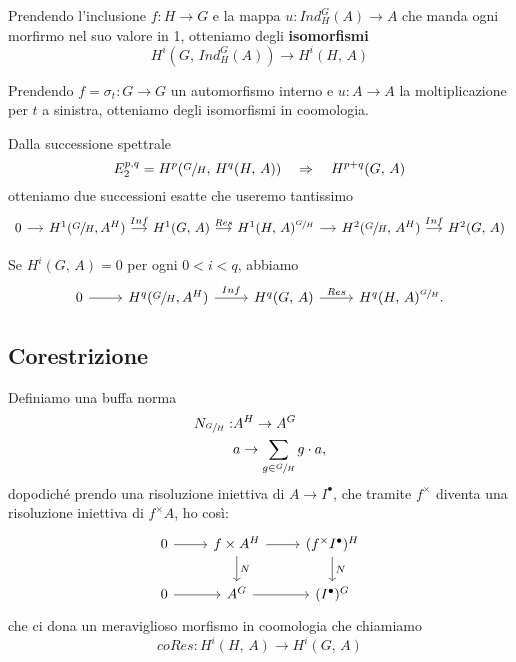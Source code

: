 \documentclass[a4paper]{article}
\begin{document}
	\begin{theorem}
		Prendendo l'inclusione $ f \colon H \to G $ e la mappa $ u \colon Ind_H^G(A) \to A $ che manda ogni morfirmo nel suo valore in 1, otteniamo degli \textbf{isomorfismi} \[ H^i(G, \, Ind_H^G(A)) \to H^i(H, \, A) \]
	\end{theorem}

	\begin{theorem}
		Prendendo $ f = \sigma_t \colon G \to G $ un automorfismo interno e $ u \colon A \to A $ la moltiplicazione per $ t $ a sinistra, otteniamo degli isomorfismi in coomologia.
	\end{theorem}

	\begin{theorem}
		Dalla successione spettrale \[ E^{p, q}_2 = H^p(\sfrac{G}{H}, \, H^q(H, \, A)) \quad\Rightarrow\quad H^{p+q}(G,\, A) \] otteniamo due successioni esatte che useremo tantissimo
		\[ \begin{tikzcd}[column sep = small]
		0 \rar & H^1(\sfrac{G}{H}, A^H) \rar["Inf"] & H^1(G, \, A) \rar["Res"] & H^1(H, \, A)^{\sfrac{G}{H}} \rar & H^2(\sfrac{G}{H}, \, A^H) \rar["Inf"] & H^2(G, \, A)
		\end{tikzcd} \]
	\end{theorem}

	\begin{theorem}
		Se $ H^i(G, \, A) = 0 $ per ogni $ 0 < i < q $, abbiamo
		\[\begin{tikzcd}
		0 \rar & H^q(\sfrac{G}{H}, A^H) \rar["Inf"] & H^q(G, \, A) \rar["Res"] & H^q(H, \, A)^{\sfrac{G}{H}}.
		\end{tikzcd} \]
	\end{theorem}
	
	\subsection{Corestrizione}
	Definiamo una buffa norma
	\begin{align*}
		N_{\sfrac{G}{H}} : & A^H \to A^G \\
		& a \to \sum_{g \in \sfrac{G}{H} } g\cdot a,
	\end{align*}
	dopodiché prendo una risoluzione iniettiva di $ A \to I^\bullet $, che tramite $ f^\times $ diventa una risoluzione iniettiva di $ f^\times A $, ho così:
	\[ \begin{tikzcd}
	0 \rar & f\times A^H \rar \dar["N"] & (f^\times I^\bullet) ^H \dar["N"] \\
	0 \rar & A^G \rar & (I^\bullet)^G
	\end{tikzcd} \]
	che ci dona un meraviglioso morfismo in coomologia che chiamiamo
	\[ coRes \colon H^i(H,\, A) \to H^i(G, \, A)  \]
	
\end{document}
